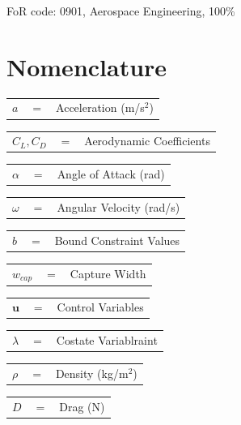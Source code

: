  FoR code: 0901, Aerospace Engineering, 100\%

\tableofcontents

\listoffigures
{}
\listoftables
{}

\newpage
\section*{Nomenclature}



\noindent
\begin{tabular}{p{0.8cm}p{0.8cm}p{5.6cm}}
	$a$ & $=$ & Acceleration (m/s$^2$)\\
\end{tabular} 
\begin{tabular}{p{0.8cm}p{0.8cm}p{5.6cm}}
	$C_L,C_D$ & $=$ & Aerodynamic Coefficients\\
\end{tabular} 
\begin{tabular}{p{0.8cm}p{0.8cm}p{5.6cm}}
	$\alpha$ & $=$ & Angle of Attack (rad)\\
\end{tabular} 
\begin{tabular}{p{0.8cm}p{0.8cm}p{5.6cm}}
	$\omega$ & $=$ & Angular Velocity (rad/s)\\
\end{tabular} 
\begin{tabular}{p{0.8cm}p{0.8cm}p{5.6cm}}
	$b$ & $=$ & Bound Constraint Values\\
\end{tabular}
\begin{tabular}{p{0.8cm}p{0.8cm}p{5.6cm}}
	$w_{cap}$ & $=$ & Capture Width\\
\end{tabular} 
\begin{tabular}{p{0.8cm}p{0.8cm}p{5.6cm}}
	$\textbf{u}$& $=$ & Control Variables\\
\end{tabular} 
\begin{tabular}{p{0.8cm}p{0.8cm}p{5.6cm}}
	$\lambda$ & $=$ & Costate Variablraint 
\end{tabular}
\begin{tabular}{p{0.8cm}p{0.8cm}p{5.6cm}}
	$\rho$ & $=$ & Density (kg/m$^2$)\\
\end{tabular} 
\begin{tabular}{p{0.8cm}p{0.8cm}p{5.6cm}}
	$D$ & $=$ & Drag (N)\\
\end{tabular} 
